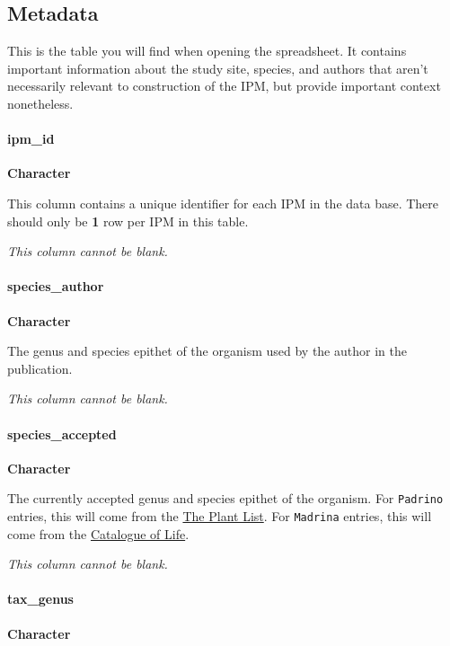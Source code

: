 \documentclass[]{article}
\let\oldparagraph\paragraph
\renewcommand{\paragraph}[1]{\oldparagraph{#1}\mbox{}}
\begin{document}
\subsection{Metadata}\label{metadata}

This is the table you will find when opening the spreadsheet. It
contains important information about the study site, species, and
authors that aren't necessarily relevant to construction of the IPM, but
provide important context nonetheless.

\paragraph{ipm\_id}\label{ipm_id}

\textbf{Character}

This column contains a unique identifier for each IPM in the data base.
There should only be \textbf{1} row per IPM in this table.

\emph{This column cannot be blank.}

\paragraph{species\_author}\label{species_author}

\textbf{Character}

The genus and species epithet of the organism used by the author in the
publication.

\emph{This column cannot be blank.}

\paragraph{species\_accepted}\label{species_accepted}

\textbf{Character}

The currently accepted genus and species epithet of the organism. For
\texttt{Padrino} entries, this will come from the
\href{http://www.theplantlist.org/}{The Plant List}. For
\texttt{Madrina} entries, this will come from the
\href{http://www.catalogueoflife.org/}{Catalogue of Life}.

\emph{This column cannot be blank.}

\paragraph{tax\_genus}\label{tax_genus}

\textbf{Character}
\end{document}
